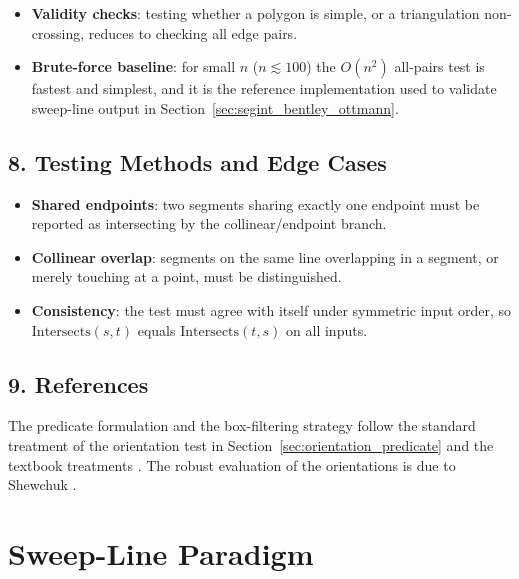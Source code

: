 \begin{itemize}
\item \textbf{Validity checks}: testing whether a polygon is simple, or a
  triangulation non-crossing, reduces to checking all edge pairs.
\item \textbf{Brute-force baseline}: for small $n$ ($n \lesssim 100$) the
  $O(n^2)$ all-pairs test is fastest and simplest, and it is the reference
  implementation used to validate sweep-line output in
  Section~\ref{sec:segint_bentley_ottmann}.
\end{itemize}

\subsection{8. Testing Methods and Edge Cases}

\begin{itemize}
\item \textbf{Shared endpoints}: two segments sharing exactly one endpoint
  must be reported as intersecting by the collinear/endpoint branch.
\item \textbf{Collinear overlap}: segments on the same line overlapping in a
  segment, or merely touching at a point, must be distinguished.
\item \textbf{Consistency}: the test must agree with itself under
  symmetric input order, so $\text{Intersects}(s,t)$ equals
  $\text{Intersects}(t,s)$ on all inputs.
\end{itemize}

\subsection{9. References}

The predicate formulation and the box-filtering strategy follow the standard
treatment of the orientation test in Section~\ref{sec:orientation_predicate}
and the textbook treatments \cite{preparata1985,berg2008}. The robust
evaluation of the orientations is due to Shewchuk \cite{shewchuk1997}.

\section{Sweep-Line Paradigm}
\label{sec:segint_sweep_line}

